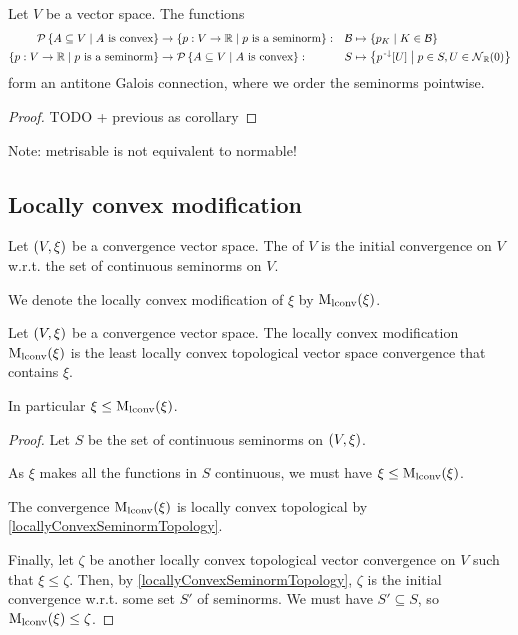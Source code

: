 \begin{proposition}
Let $V$ be a vector space. The functions
\begin{align*}
\powerset\setbuilder{A\subseteq V}{\text{$A$ is convex}} &\to \setbuilder{p: V\to \R}{\text{$p$ is a seminorm}}: &&\mathcal{B}\mapsto \setbuilder{p_K}{K\in \mathcal{B}} \\
\setbuilder{p: V\to \R}{\text{$p$ is a seminorm}} &\to \powerset\setbuilder{A\subseteq V}{\text{$A$ is convex}}: &&S\mapsto \setbuilder{p^\preimf[U]}{p\in S, U\in \neighbourhood_\R(0)}
\end{align*}
form an antitone Galois connection, where we order the seminorms pointwise.
\end{proposition}
\begin{proof}
TODO + previous as corollary
\end{proof}

Note: metrisable is not equivalent to normable!


\subsection{Locally convex modification}
\begin{definition}
Let $\sSet{V, \xi}$ be a convergence vector space. The  of $V$ is the initial convergence on $V$ w.r.t. the set of continuous seminorms on $V$.

We denote the locally convex modification of $\xi$ by $\operatorname{M_\text{lconv}}(\xi)$.
\end{definition}

\begin{lemma} \label{locallyConvexModLemma}
Let $\sSet{V, \xi}$ be a convergence vector space. The locally convex modification $\operatorname{M_\text{lconv}}(\xi)$ is the least locally convex topological vector space convergence that contains $\xi$.
\end{lemma}
In particular $\xi \leq \operatorname{M_\text{lconv}}(\xi)$.
\begin{proof}
Let $S$ be the set of continuous seminorms on $\sSet{V, \xi}$.

As $\xi$ makes all the functions in $S$ continuous, we must have $\xi \leq \operatorname{M_\text{lconv}}(\xi)$.

The convergence $\operatorname{M_\text{lconv}}(\xi)$ is locally convex topological by \ref{locallyConvexSeminormTopology}.

Finally, let $\zeta$ be another locally convex topological vector convergence on $V$ such that $\xi \leq \zeta$. Then, by \ref{locallyConvexSeminormTopology}, $\zeta$ is the initial convergence w.r.t. some set $S'$ of seminorms. We must have $S'\subseteq S$, so $\operatorname{M_\text{lconv}}(\xi)\leq \zeta$.
\end{proof}

